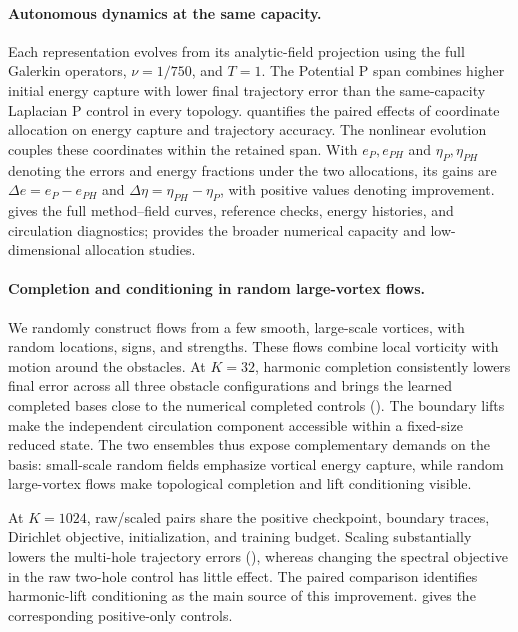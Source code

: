 \paragraph{Autonomous dynamics at the same capacity.}
\begingroup
Each representation evolves from its analytic-field projection using the full Galerkin operators, $\nu=1/750$, and $T=1$. The Potential P span combines higher initial energy capture with lower final trajectory error than the same-capacity Laplacian P control in every topology.  quantifies the paired effects of coordinate allocation on energy capture and trajectory accuracy. The nonlinear evolution couples these coordinates within the retained span. With $e_P,e_{PH}$ and $\eta_P,\eta_{PH}$ denoting the errors and energy fractions under the two allocations, its gains are $\Delta e=e_P-e_{PH}$ and $\Delta\eta=\eta_{PH}-\eta_P$, with positive values denoting improvement.  gives the full method--field curves, reference checks, energy histories, and circulation diagnostics;  provides the broader numerical capacity and low-dimensional allocation studies.
\par\endgroup



\paragraph{Completion and conditioning in random large-vortex flows.}
\begingroup
We randomly construct flows from a few smooth, large-scale vortices, with random locations, signs, and strengths. These flows combine local vorticity with motion around the obstacles. At $K=32$, harmonic completion consistently lowers final error across all three obstacle configurations and brings the learned completed bases close to the numerical completed controls (). The boundary lifts make the independent circulation component accessible within a fixed-size reduced state. The two ensembles thus expose complementary demands on the basis: small-scale random fields emphasize vortical energy capture, while random large-vortex flows make topological completion and lift conditioning visible.
\par\endgroup


{At $K=1024$, raw/scaled pairs share the positive checkpoint, boundary traces, Dirichlet objective, initialization, and training budget. Scaling substantially lowers the multi-hole trajectory errors (), whereas changing the spectral objective in the raw two-hole control has little effect. The paired comparison identifies harmonic-lift conditioning as the main source of this improvement.  gives the corresponding positive-only controls.}

